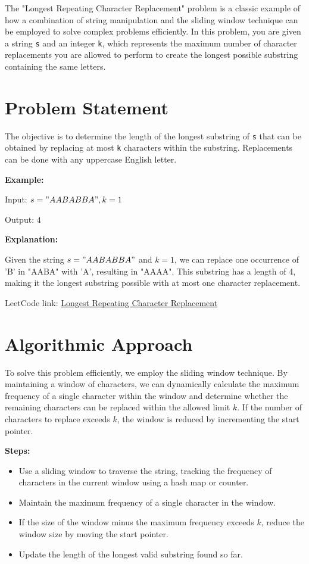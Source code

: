 
\label{problem:Longest_Repeating_Character_Replacement}

The "Longest Repeating Character Replacement" problem is a classic example of how a combination of string manipulation and the sliding window technique can be employed to solve complex problems efficiently. In this problem, you are given a string \texttt{s} and an integer \texttt{k}, which represents the maximum number of character replacements you are allowed to perform to create the longest possible substring containing the same letters.

\section*{Problem Statement}
The objective is to determine the length of the longest substring of \texttt{s} that can be obtained by replacing at most \texttt{k} characters within the substring. Replacements can be done with any uppercase English letter.

\textbf{Example:}

Input: \( s = "AABABBA", k = 1 \)

Output: \( 4 \)

\textbf{Explanation:}

Given the string \( s = "AABABBA" \) and \( k = 1 \), we can replace one occurrence of 'B' in "AABA" with 'A', resulting in "AAAA". This substring has a length of 4, making it the longest substring possible with at most one character replacement.

LeetCode link: \href{https://leetcode.com/problems/longest-repeating-character-replacement/}{Longest Repeating Character Replacement}

\section*{Algorithmic Approach}
To solve this problem efficiently, we employ the sliding window technique. By maintaining a window of characters, we can dynamically calculate the maximum frequency of a single character within the window and determine whether the remaining characters can be replaced within the allowed limit \( k \). If the number of characters to replace exceeds \( k \), the window is reduced by incrementing the start pointer.

\textbf{Steps:}
\begin{itemize}
    \item Use a sliding window to traverse the string, tracking the frequency of characters in the current window using a hash map or counter.
    \item Maintain the maximum frequency of a single character in the window.
    \item If the size of the window minus the maximum frequency exceeds \( k \), reduce the window size by moving the start pointer.
    \item Update the length of the longest valid substring found so far.
\end{itemize}

